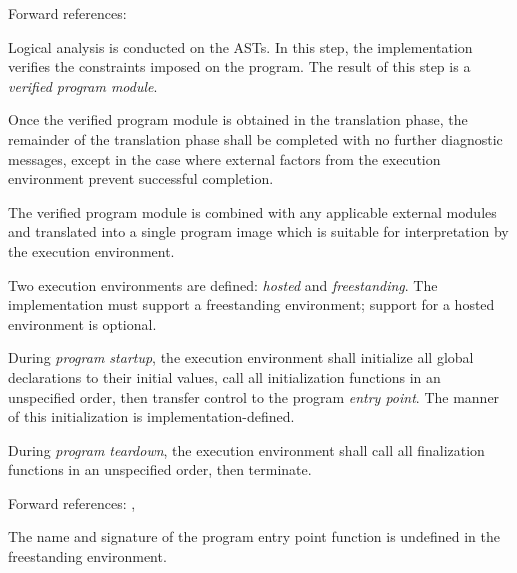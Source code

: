 Forward references: 

\specsubitem
Logical analysis is conducted on the ASTs. In this step, the implementation
verifies the constraints imposed on the program. The result of this step is a
\textit{verified program module}.


\specsubitem
Once the verified program module is obtained in the translation phase, the
remainder of the translation phase shall be completed with no further
diagnostic messages, except in the case where external factors from the
execution environment prevent successful completion.


\specsubitem
The verified program module is combined with any applicable external modules and
translated into a single program image which is suitable for interpretation by
the execution environment.


\specsubitem
Two execution environments are defined: \textit{hosted} and
\textit{freestanding}. The implementation must support a freestanding
environment; support for a hosted environment is optional.

\specsubitem
During \textit{program startup}, the execution environment shall initialize all
global declarations to their initial values, call all initialization functions
in an unspecified order, then transfer control to the program \textit{entry
point}. The manner of this initialization is implementation-defined.


\specsubitem
During \textit{program teardown}, the execution environment shall call all
finalization functions in an unspecified order, then terminate.

Forward references: , 


\specsubsubitem
The name and signature of the program entry point function is undefined in the
freestanding environment.

